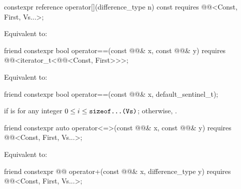 \begin{itemdecl}
constexpr reference operator[](difference_type n) const
  requires @@<Const, First, Vs...>;
\end{itemdecl}

\begin{itemdescr}
\pnum
\effects
Equivalent to: 
\end{itemdescr}

\begin{itemdecl}
friend constexpr bool operator==(const @@& x, const @@& y)
  requires @@<iterator_t<@@<Const, First>>>;
\end{itemdecl}

\begin{itemdescr}
\pnum
\effects
Equivalent to: 
\end{itemdescr}

\begin{itemdecl}
friend constexpr bool operator==(const @@& x, default_sentinel_t);
\end{itemdecl}

\begin{itemdescr}
\pnum
\returns
{} if 
is 
for any integer $0 \le i \le \texttt{\protect sizeof...(Vs)}$;
otherwise, .
\end{itemdescr}

\begin{itemdecl}
friend constexpr auto operator<=>(const @@& x, const @@& y)
  requires @@<Const, First, Vs...>;
\end{itemdecl}

\begin{itemdescr}
\pnum
\effects
Equivalent to: 
\end{itemdescr}

\begin{itemdecl}
friend constexpr @@ operator+(const @@& x, difference_type y)
  requires @@<Const, First, Vs...>;
\end{itemdecl}


